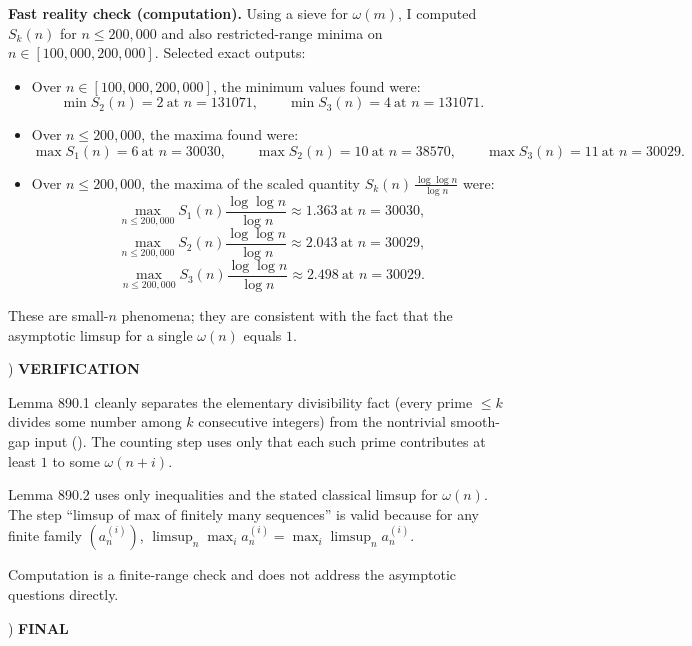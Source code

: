 \medskip
\noindent \textbf{Fast reality check (computation).}
Using a sieve for $\omega(m)$, I computed $S_k(n)$ for $n\le 200{,}000$ and also restricted-range minima on $n\in[100{,}000,200{,}000]$.
Selected exact outputs:
\begin{itemize}
\item Over $n\in[100{,}000,200{,}000]$, the minimum values found were:
\[
\min S_2(n)=2\ \text{at }n=131071,\qquad
\min S_3(n)=4\ \text{at }n=131071.
\]
\item Over $n\le 200{,}000$, the maxima found were:
\[
\max S_1(n)=6\ \text{at }n=30030,\qquad
\max S_2(n)=10\ \text{at }n=38570,\qquad
\max S_3(n)=11\ \text{at }n=30029.
\]
\item Over $n\le 200{,}000$, the maxima of the scaled quantity $S_k(n)\,\frac{\log\log n}{\log n}$ were:
\[
\max_{n\le 200{,}000} S_1(n)\frac{\log\log n}{\log n}\approx 1.363\ \text{at }n=30030,
\]
\[
\max_{n\le 200{,}000} S_2(n)\frac{\log\log n}{\log n}\approx 2.043\ \text{at }n=30029,
\]
\[
\max_{n\le 200{,}000} S_3(n)\frac{\log\log n}{\log n}\approx 2.498\ \text{at }n=30029.
\]
\end{itemize}
These are small-$n$ phenomena; they are consistent with the fact that the asymptotic limsup for a single $\omega(n)$ equals $1$.

) \textbf{VERIFICATION}

\noindent Lemma 890.1 cleanly separates the elementary divisibility fact (every prime $\le k$ divides some number among $k$ consecutive integers) from the nontrivial smooth-gap input (\*).
The counting step uses only that each such prime contributes at least $1$ to some $\omega(n+i)$.

\noindent Lemma 890.2 uses only inequalities and the stated classical limsup for $\omega(n)$.
The step ``limsup of max of finitely many sequences'' is valid because for any finite family $(a^{(i)}_n)$,
\(\limsup_n \max_i a^{(i)}_n = \max_i \limsup_n a^{(i)}_n\).

\noindent Computation is a finite-range check and does not address the asymptotic questions directly.

) \textbf{FINAL}

